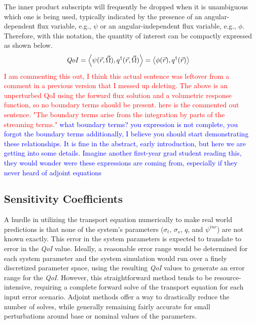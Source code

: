 \documentclass[12pt]{report}
\newcommand{\vr}{\vec{r}}
\newcommand{\vO}{\vec{\Omega}}
\newcommand{\bra}{\left\langle}
\newcommand{\ket}{\right\rangle}
\newcommand{\sigt}{\sigma_t}
\newcommand{\sigs}{\sigma_s}
\newcommand{\angResp}{q^\dag}
\newcommand{\scalResp}{q^\dag}
\newcommand{\qoi}{{\it QoI}\xspace}
\newcommand{\comment}[2]{\marginpar{\textcolor{#2}{$\star$}}\textcolor{#2}{#1}\newline}
\newcommand{\iwh}[1]{\comment{#1}{red}}
\newcommand{\jcr}[1]{\comment{#1}{blue}}
\newcommand{\iwh}[1]{\phantom{a}}
\newcommand{\jcr}[1]{\phantom{a}}
\begin{document}
The inner product subscripts will frequently be dropped when it is unambiguous which one is being used,
 typically indicated by the presence of an angular-dependent flux variable, e.g., $\psi$ or an 
 angular-independent flux variable, e.g., $\phi$. Therefore, with this notation, the quantity of interest 
 can be compactly expressed as shown below.
\begin{equation}
\label{QoIDef}
\qoi = \bra \psi(\vr,\vO), \angResp(\vr,\vO) \ket  = \bra \phi(\vr) , \scalResp(\vr) \ket
\end{equation}
\iwh{I am commenting this out, I think this actual sentence was leftover from a comment in a previous version that I messed up deleting. 
The above is an unperturbed QoI using the forward flux solution and a volumetric response function, so no boundary terms should be present. 
here is the commented out sentence. "The boundary terms arise from the integration by parts of the streaming terms."}
\jcr{what boundary terms? you expression is not complete, you forgot the boundary terms}
\jcr{additionally, I believe you should start demonstrating these relationships. It is fine in the abstract,
 early introduction, but here we are getting into some details. Imagine another
first-year grad student reading this, they would wonder were these expressions are coming from, 
especially if they never heard of adjoint equations}

\subsection{Sensitivity Coefficients}
A hurdle in utilizing the transport equation numerically to make real world predictions is that none of 
the system's parameters ($\sigt$, $\sigs$, $q$, and $\psi^{inc}$) are not known exactly. This error in 
the system parameters is expected to translate to error in the \qoi value. Ideally, a reasonable error 
range would be determined for each system parameter and the system simulation would run over a finely 
discretized parameter space, using the resulting \qoi values to generate an error range for the \qoi. 
However, this straightforward method tends to be resource-intensive, requiring a complete forward solve 
of the transport equation for each input error scenario. Adjoint methods offer a way to drastically 
reduce the number of solves, while generally remaining fairly accurate for small perturbations around 
base or nominal values of the parameters.
\end{document}
